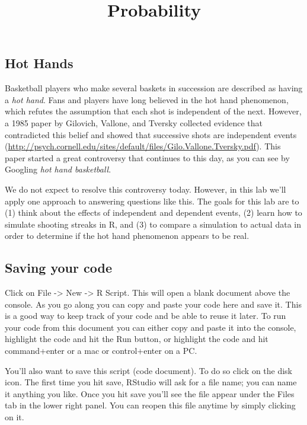 \documentclass[
]{article}
\title{Probability}
\author{}
\date{\vspace{-2.5em}}
\begin{document}
\maketitle

\hypertarget{hot-hands}{%
\subsection{Hot Hands}\label{hot-hands}}

Basketball players who make several baskets in succession are described
as having a \emph{hot hand}. Fans and players have long believed in the
hot hand phenomenon, which refutes the assumption that each shot is
independent of the next. However, a 1985 paper by Gilovich, Vallone, and
Tversky collected evidence that contradicted this belief and showed that
successive shots are independent events
(\url{http://psych.cornell.edu/sites/default/files/Gilo.Vallone.Tversky.pdf}).
This paper started a great controversy that continues to this day, as
you can see by Googling \emph{hot hand basketball}.

We do not expect to resolve this controversy today. However, in this lab
we'll apply one approach to answering questions like this. The goals for
this lab are to (1) think about the effects of independent and dependent
events, (2) learn how to simulate shooting streaks in R, and (3) to
compare a simulation to actual data in order to determine if the hot
hand phenomenon appears to be real.

\hypertarget{saving-your-code}{%
\subsection{Saving your code}\label{saving-your-code}}

Click on File -\textgreater{} New -\textgreater{} R Script. This will
open a blank document above the console. As you go along you can copy
and paste your code here and save it. This is a good way to keep track
of your code and be able to reuse it later. To run your code from this
document you can either copy and paste it into the console, highlight
the code and hit the Run button, or highlight the code and hit
command+enter or a mac or control+enter on a PC.

You'll also want to save this script (code document). To do so click on
the disk icon. The first time you hit save, RStudio will ask for a file
name; you can name it anything you like. Once you hit save you'll see
the file appear under the Files tab in the lower right panel. You can
reopen this file anytime by simply clicking on it.
\end{document}

